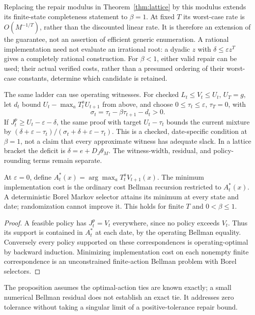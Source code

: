 Replacing the repair modulus in Theorem~\ref{thm:lattice} by this modulus extends its finite-state completeness statement to $\beta=1$. At fixed $T$ its worst-case rate is $O(M^{-1/T})$, rather than the discounted linear rate. It is therefore an extension of the guarantee, not an assertion of efficient generic enumeration. A rational implementation need not evaluate an irrational root: a dyadic $z$ with $\delta\leq\varepsilon z^T$ gives a completely rational construction. For $\beta<1$, either valid repair can be used; their actual verified costs, rather than a presumed ordering of their worst-case constants, determine which candidate is retained.

The same ladder can use operating witnesses. For checked $L_t\leq V_t\leq U_t$, $U_T=g$, let $d_t$ bound $U_t-\max_aT_t^aU_{t+1}$ from above, and choose $0\leq\tau_t\leq\varepsilon$, $\tau_T=0$, with
\[
 \sigma_t=\tau_t-\beta\tau_{t+1}-d_t>0.
\]
If $J_t^p\geq U_t-\varepsilon-\delta$, the same proof with target $U_t-\tau_t$ bounds the current mixture by
$(\delta+\varepsilon-\tau_t)/(\sigma_t+\delta+\varepsilon-\tau_t)$.
This is a checked, date-specific condition at $\beta=1$, not a claim that every approximate witness has adequate slack. In a lattice bracket the deficit is $\delta=e+D_J\theta_M$. The witness-width, residual, and policy-rounding terms remain separate.

\begin{proposition}\label{prop:zero}
At $\varepsilon=0$, define $A_t^*(x)=\arg\max_a T_t^aV_{t+1}(x)$. The minimum implementation cost is the ordinary cost Bellman recursion restricted to $A_t^*(x)$. A deterministic Borel Markov selector attains its minimum at every state and date; randomization cannot improve it. This holds for finite $T$ and $0<\beta\leq1$.
\end{proposition}
\begin{proof}
A feasible policy has $J_t^p=V_t$ everywhere, since no policy exceeds $V_t$. Thus its support is contained in $A_t^*$ at each date, by the operating Bellman equality. Conversely every policy supported on these correspondences is operating-optimal by backward induction. Minimizing implementation cost on each nonempty finite correspondence is an unconstrained finite-action Bellman problem with Borel selectors.
\end{proof}
The proposition assumes the optimal-action ties are known exactly; a small numerical Bellman residual does not establish an exact tie. It addresses zero tolerance without taking a singular limit of a positive-tolerance repair bound.

